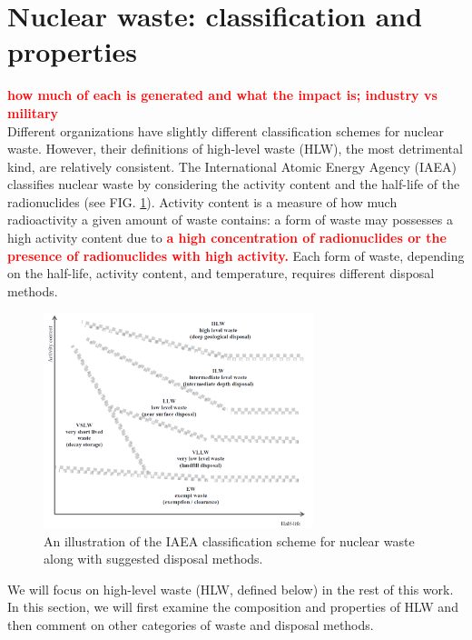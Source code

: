 \documentclass[nofootinbib,preprint,aip,pra]{revtex4-1}
\newcommand{\red}[1]{\textcolor{red}{\bf #1}}
\begin{document}
\section{Nuclear waste: classification and properties}
\label{sec:waste}
    \red{how much of each is generated and what the impact is; industry vs military}\\
    Different organizations have slightly different classification schemes for nuclear waste.
    However, their definitions of high-level waste (HLW), the most detrimental kind, are relatively consistent.
    The International Atomic Energy Agency (IAEA) classifies nuclear waste by considering the activity
    content and the half-life of the radionuclides (see FIG. \ref{fig:scheme}).
    Activity content is a measure of how much radioactivity
    a given amount of waste contains: a form of waste may possesses a high activity content due to
    \red{a high concentration of radionuclides or the presence of radionuclides with high activity.}\cite{iaea09}
    Each form of waste, depending on the half-life, activity content, and temperature, requires different
    disposal methods.
    \begin{figure}[h]
        \centering
        \includegraphics[width=0.7\textwidth]{wastescheme.png}
        \caption{An illustration of the IAEA classification scheme for nuclear waste along with suggested
        disposal methods.\cite{iaea09}}
        \label{fig:scheme}
    \end{figure}
    We will focus on high-level waste (HLW, defined below) in the rest of this work.
    In this section, we will first examine the composition and properties of HLW and then
    comment on other categories of waste and disposal methods.
\end{document}
